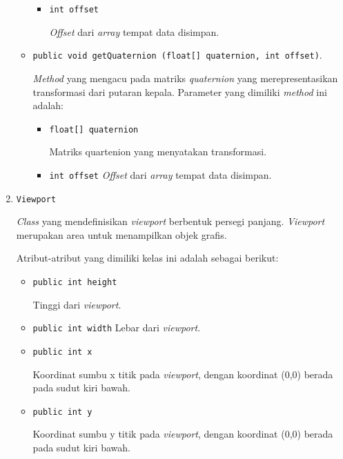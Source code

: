 \begin{enumerate}
\begin{itemize}
\begin{itemize}
				\item \texttt{int offset}	
				
				\textit{Offset} dari \textit{array} tempat data disimpan.		
			\end{itemize}	
			
			\item \texttt{public void getQuaternion (float[] quaternion, int offset)}. 
			
			\textit{Method} yang mengacu pada matriks \textit{quaternion} yang merepresentasikan transformasi dari putaran kepala. Parameter yang dimiliki \textit{method} ini adalah:
			
			\begin{itemize}
				\item \texttt{float[] quaternion}
				
				Matriks quartenion yang menyatakan transformasi.
				
				\item \texttt{int offset}				
				\textit{Offset} dari \textit{array} tempat data disimpan.
			\end{itemize}
		\end{itemize}
		
		\item \texttt{Viewport}
		
		\textit{Class} yang mendefinisikan \textit{viewport} berbentuk persegi panjang. \textit{Viewport} merupakan area untuk menampilkan objek grafis.  
		
		Atribut-atribut yang dimiliki kelas ini adalah sebagai berikut:
		
		\begin{itemize}
			\item \texttt{public int height}
			
			Tinggi dari \textit{viewport}.
			
			\item \texttt{public int width}
			Lebar dari \textit{viewport}.			
			
			\item \texttt{public int x}
			
			Koordinat sumbu x titik pada \textit{viewport}, dengan koordinat (0,0) berada pada sudut kiri bawah.
			
			\item \texttt{public int y}
			
			Koordinat sumbu y titik pada \textit{viewport}, dengan koordinat (0,0) berada pada sudut kiri bawah.
		\end{itemize}
			

\end{enumerate}
